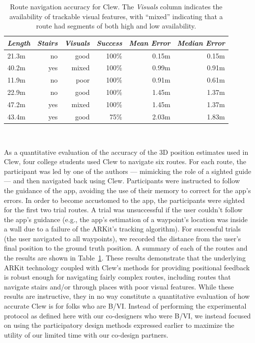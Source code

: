 \documentclass[chi_draft]{sigchi}
\newcommand{\BVI}{B/VI\xspace}
\begin{document}
\begin{table}
  \centering
  \begin{tabular}{l r r r | r  r}
    {\small \textit{Length}}
      & {\small \textit{Stairs}}
    & {\small \textit{Visuals}}
        & {\small \textit{Success}}
        & {\small \textit{Mean Error}} 
                & {\small \textit{Median Error}} \\
    \midrule
    21.3m & no & good & 100\% & 0.15m & 0.15m \\
    40.2m & yes & mixed & 100\% & 0.99m & 0.91m \\
    11.9m & no & poor & 100\% & 0.91m & 0.61m \\
    22.9m & no & good & 100\% & 1.45m & 1.37m \\
        47.2m & yes & mixed & 100\%& 1.45m & 1.37m \\
            43.4m & yes & good & 75\% & 2.03m & 1.83m \\
  \end{tabular}
  \caption{Route navigation accuracy for Clew.  The \emph{Visuals} column indicates the availability of trackable visual features, with ``mixed'' indicating that a route had segments of both high and low availability.}~\label{tab:clewusability}
\end{table}

As a quantitative evaluation of the accuracy of the 3D position estimates used in Clew, four college students used Clew to navigate six routes.  For each route, the participant was led by one of the authors --- mimicking the role of a sighted guide --- and then navigated back using Clew.  Participants were instructed to follow the guidance of the app, avoiding the use of their memory to correct for the app's errors.  In order to become accustomed to the app, the participants were sighted for the first two trial routes.  A trial was unsuccessful if the user couldn't follow the app's guidance (e.g., the app's estimation of a waypoint's location was inside a wall due to a failure of the ARKit's tracking algorithm). For successful trials (the user navigated to all waypoints), we recorded the distance from the user's final position to the ground truth position.  A summary of each of the routes and the results are shown in Table~\ref{tab:clewusability}.  These results demonstrate that the underlying ARKit technology coupled with Clew's methods for providing positional feedback is robust enough for navigating fairly complex routes, including routes that navigate stairs and/or through places with poor visual features.  While these results are instructive, they in no way constitute a quantitative evaluation of how accurate Clew is for folks who are \BVI.  Instead of performing the experimental protocol as defined here with our co-designers who were \BVI, we instead focused on using the participatory design methods expressed earlier to maximize the utility of our limited time with our co-design partners.
\end{document}
